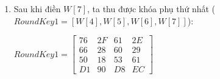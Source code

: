 \begin{enumerate}[label= \textbf{Bước \arabic*:}]
	\begin{center}
		$W[5] = W[4] \oplus W[1] = \begin{bmatrix} 76\\66\\50\\D1\end{bmatrix} \oplus \begin{bmatrix} 4C\\45\\48\\55\end{bmatrix} = \begin{bmatrix} 2F\\28\\18\\90\end{bmatrix}$\\
		$W[6] = W[5] \oplus W[2] = \begin{bmatrix} 2F\\28\\18\\90\end{bmatrix} \oplus \begin{bmatrix} 59\\4E\\48\\41\end{bmatrix} =  \begin{bmatrix} 61\\60\\53\\D8\end{bmatrix}$\\
		$W[7] = W[6] \oplus W[3] = \begin{bmatrix} 61\\60\\53\\D8\end{bmatrix} \oplus \begin{bmatrix} 4F\\49\\32\\34\end{bmatrix} = \begin{bmatrix} 2E\\29\\61\\EC\end{bmatrix}$\\
	\end{center}
	
	\item Sau khi điền $W[7]$, ta thu được khóa phụ thứ nhất ($RoundKey1= [W[4],W[5],W[6],W[7]]$):
	\begin{center}
		$
		RoundKey1 = 
		\begin{bmatrix}
			76 & 2F & 61 & 2E\\
			66 & 28 & 60 & 29 \\
			50 & 18 & 53 & 61 \\
			D1 & 90 & D8 & EC
		\end{bmatrix}
		$
	\end{center}
	

\end{enumerate}
